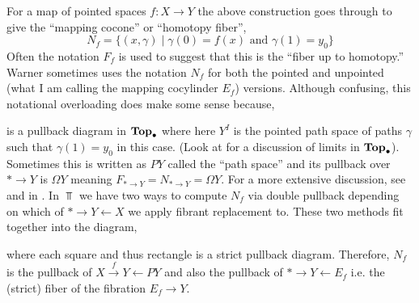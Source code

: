 \documentclass[12pt]{extarticle}
\begin{document}
\begin{rmk}
For a map of pointed spaces $f : X \to Y$ the above construction goes through to give the ``mapping cocone'' or ``homotopy fiber'',
\[ N_f = \{ (x, \gamma) \mid \gamma(0) = f(x) \text{ and } \gamma(1) = y_0 \} \]
Often the notation $F_f$ is used to suggest that this is the ``fiber up to homotopy.'' Warner sometimes uses the notation $N_f$ for both the pointed and unpointed (what I am calling the mapping cocylinder $E_f$) versions. Although confusing, this notational overloading does make some sense because,
\begin{center}
\end{center}
is a pullback diagram in $\mathbf{Top}_{\bullet}$ where here $Y^I$ is the pointed path space of paths $\gamma$ such that $\gamma(1) = y_0$ in this case. (Look at  for a discussion of limits in $\mathbf{Top}_{\bullet}$). Sometimes this is written as $PY$ called the ``path space'' and its pullback over $* \to Y$ is $\Omega Y$ meaning $F_{* \to Y} = N_{* \to Y} = \Omega Y$. For a more extensive discussion, see  and  in . In $\Top$ we have two ways to compute $N_f$ via double pullback depending on which of $* \to Y \leftarrow X$ we apply fibrant replacement to. These two methods fit together into the diagram,
\begin{center}
\end{center}
where each square and thus rectangle is a strict pullback diagram. Therefore, $N_f$ is the pullback of $X \xrightarrow{f} Y \leftarrow PY$ and also the pullback of $* \to Y \leftarrow E_f$ i.e. the (strict) fiber of the fibration $E_f \to Y$.
\end{rmk}
\end{document}
